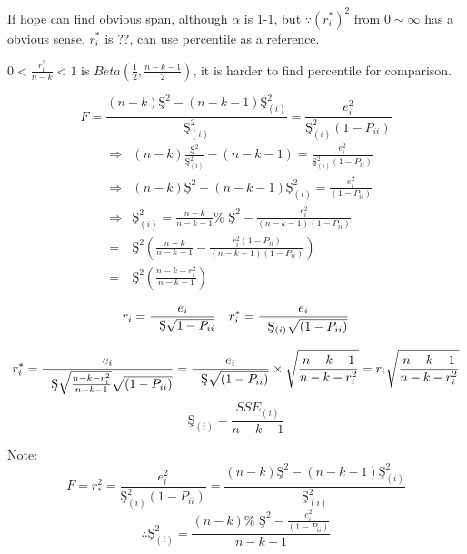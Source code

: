 \documentclass{article}
\begin{document}
If hope can find obvious span, although $\alpha $ is 1-1, but $\because
\left( r_{i}^{\ast }\right) ^{2}$ from $0\sim \infty $ has a obvious sense. $%
r_{i}^{\ast }$ is ??, can use percentile as a reference.

$0<\frac{r_{i}^{2}}{n-k}<1$ is $Beta\left( \frac{1}{2},\frac{n-k-1}{2}%
\right) $, it is harder to find percentile for comparison.

\begin{equation*}
F=\frac{\left( n-k\right) \text{\c{S}}^{2}-\left( n-k-1\right) \text{\c{S}}%
_{\left( i\right) }^{2}}{\text{\c{S}}_{\left( i\right) }^{2}}=\frac{e_{i}^{2}%
}{\text{\c{S}}_{\left( i\right) }^{2}\left( 1-P_{ii}\right) }
\end{equation*}%
\begin{eqnarray*}
&\Longrightarrow &\left( n-k\right) \frac{\text{\c{S}}^{2}}{\text{\c{S}}%
_{\left( i\right) }^{2}}-\left( n-k-1\right) =\frac{e_{i}^{2}}{\text{\c{S}}%
_{\left( i\right) }^{2}\left( 1-P_{ii}\right) } \\
&\Longrightarrow &\left( n-k\right) \text{\c{S}}^{2}-\left( n-k-1\right) 
\text{\c{S}}_{\left( i\right) }^{2}=\frac{e_{i}^{2}}{\left( 1-P_{ii}\right) }
\\
&\Longrightarrow &\text{\c{S}}_{\left( i\right) }^{2}=\frac{n-k}{n-k-1}\text{%
\c{S}}^{2}-\frac{e_{i}^{2}}{\left( n-k-1\right) \left( 1-P_{ii}\right) } \\
&=&\text{\c{S}}^{2}\left( \frac{n-k}{n-k-1}-\frac{r_{i}^{2}\left(
1-P_{ii}\right) }{\left( n-k-1\right) \left( 1-P_{ii}\right) }\right) \\
&=&\text{\c{S}}^{2}\left( \frac{n-k-r_{i}^{2}}{n-k-1}\right)
\end{eqnarray*}

\begin{equation*}
r_{i}=\frac{e_{i}}{\text{\c{S}}\sqrt{1-P_{ii}}}\quad r_{i}^{\ast }=\frac{%
e_{i}}{\text{\c{S}}_{\left( i\right) }\sqrt{\left( 1-P_{ii}\right) }}
\end{equation*}

\begin{equation*}
r_{i}^{\ast }=\frac{e_{i}}{\text{\c{S}}\sqrt{\frac{n-k-r_{i}^{2}}{n-k-1}}%
\sqrt{\left( 1-P_{ii}\right) }}=\frac{e_{i}}{\text{\c{S}}\sqrt{\left(
1-P_{ii}\right) }}\times \sqrt{\frac{n-k-1}{n-k-r_{i}^{2}}}=r_{i}\sqrt{\frac{%
n-k-1}{n-k-r_{i}^{2}}}
\end{equation*}%
\begin{equation*}
\text{\c{S}}_{\left( i\right) }=\frac{SSE_{\left( i\right) }}{n-k-1}
\end{equation*}

Note:%
\begin{equation*}
F=r_{\ast }^{2}=\frac{e_{i}^{2}}{\text{\c{S}}_{\left( i\right) }^{2}\left(
1-P_{ii}\right) }=\frac{\left( n-k\right) \text{\c{S}}^{2}-\left(
n-k-1\right) \text{\c{S}}_{\left( i\right) }^{2}}{\text{\c{S}}_{\left(
i\right) }^{2}}
\end{equation*}%
\begin{equation*}
\therefore \text{\c{S}}_{\left( i\right) }^{2}=\frac{\left( n-k\right) \text{%
\c{S}}^{2}-\frac{e_{i}^{2}}{\left( 1-P_{ii}\right) }}{n-k-1}
\end{equation*}
\end{document}
